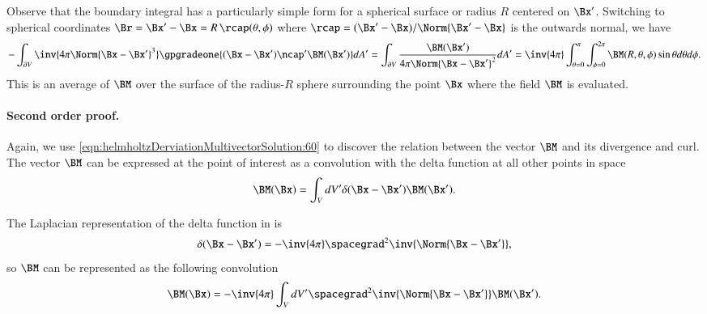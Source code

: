Observe that the boundary integral has a particularly simple form for a spherical surface or radius \( R \) centered on \( \Bx' \).
Switching to spherical coordinates \( \Br = \Bx' - \Bx = R\, \rcap(\theta, \phi) \) where \( \rcap = (\Bx' - \Bx)/\Norm{\Bx' - \Bx} \) is the outwards normal, we have
\begin{dmath}\label{eqn:helmholtzDerviationMultivectorSolution:840}
-
\int_{\partial V}
\inv{4 \pi \Norm{\Bx - \Bx'}^3 }
\gpgradeone{ (\Bx - \Bx') \ncap' \BM(\Bx') } dA'
=
\int_{\partial V}
\frac{\BM(\Bx')}{4 \pi \Norm{\Bx - \Bx'}^2 } dA'
= \inv{4\pi} \int_{\theta = 0}^\pi \int_{\phi = 0}^{2 \pi} \BM(R, \theta, \phi) \sin\theta d\theta d\phi.
\end{dmath}
This is an average of \( \BM \) over the surface of the radius-\(R\) sphere surrounding the point \( \Bx \) where the field \( \BM \) is evaluated.

\paragraph{Second order proof.}

%
%
%

Again, we use \cref{eqn:helmholtzDerviationMultivectorSolution:60}
to discover the relation between the vector \( \BM \) and its divergence and curl.
The vector \( \BM \) can be expressed at the point of interest as a convolution with the delta function at all other points in space
\begin{dmath}\label{eqn:helmholtzDerviationMultivectorSolution:80}
\BM(\Bx) = \int_V dV' \delta(\Bx - \Bx') \BM(\Bx').
\end{dmath}

The Laplacian representation of the delta function in  is
\begin{dmath}\label{eqn:helmholtzDerviationMultivectorSolution:100}
\delta(\Bx - \Bx') = -\inv{4\pi} \spacegrad^2 \inv{\Norm{\Bx - \Bx'}},
\end{dmath}
so \( \BM \) can be represented as the following convolution
\begin{dmath}\label{eqn:helmholtzDerviationMultivectorSolution:120}
\BM(\Bx) = -\inv{4\pi} \int_V dV' \spacegrad^2 \inv{\Norm{\Bx - \Bx'}} \BM(\Bx').
\end{dmath}

